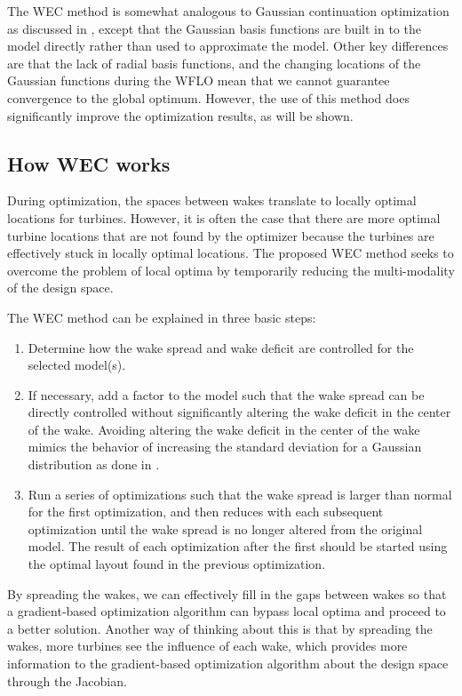 \documentclass[a4paper]{jpconf}
\begin{document}
The WEC method is somewhat analogous to Gaussian continuation optimization as discussed in \cite{mobahi2015}, except that the Gaussian basis functions are built in to the model directly rather than used to approximate the model. Other key differences are that the lack of radial basis functions, and the changing locations of the Gaussian functions during the WFLO mean that we cannot guarantee convergence to the global optimum. However, the use of this method does significantly improve the optimization results, as will be shown.

\subsection{How WEC works}
During optimization, the spaces between wakes translate to locally optimal locations for turbines. However, it is often the case that there are more optimal turbine locations that are not found by the optimizer because the turbines are effectively stuck in locally optimal locations. The proposed WEC method seeks to overcome the problem of local optima by temporarily reducing the multi-modality of the design space. 

The WEC method can be explained in three basic steps:
\begin{enumerate}[label=\arabic*)]
	\item Determine how the wake spread and wake deficit are controlled for the selected model(s).
    \item If necessary, add a factor to the model such that the wake spread can be directly controlled without significantly altering the wake deficit in the center of the wake. Avoiding altering the wake deficit in the center of the wake mimics the behavior of increasing the standard deviation for a Gaussian distribution as done in \cite{mobahi2015}.
    \item Run a series of optimizations such that the wake spread is larger than normal for the first optimization, and then reduces with each subsequent optimization until the wake spread is no longer altered from the original model. The result of each optimization after the first should be started using the optimal layout found in the previous optimization.
\end{enumerate}

By spreading the wakes, we can effectively fill in the gaps between wakes so that a gradient-based optimization algorithm can bypass local optima and proceed to a better solution. Another way of thinking about this is that by spreading the wakes, more turbines see the influence of each wake, which provides more information to the gradient-based optimization algorithm about the design space through the Jacobian. 
\end{document}
